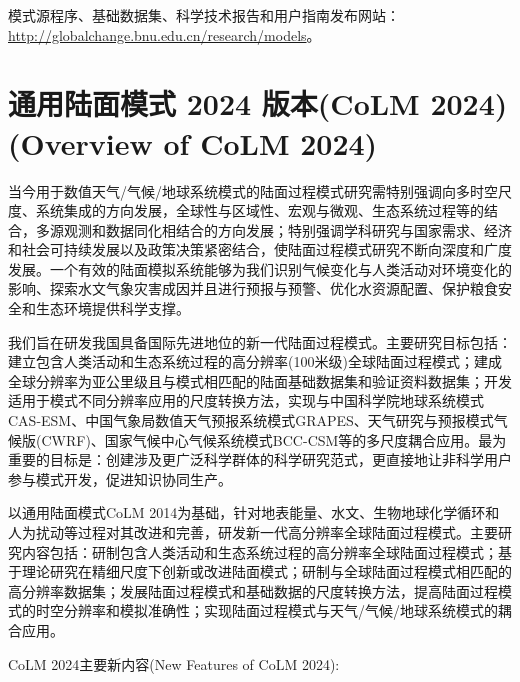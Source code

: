 模式源程序、基础数据集、科学技术报告和用户指南发布网站： \url{http://globalchange.bnu.edu.cn/research/models}。


\section[通用陆面模式 2024 版本(CoLM 2024)]{通用陆面模式 2024 版本(CoLM 2024) (Overview of CoLM 2024)}
当今用于数值天气/气候/地球系统模式的陆面过程模式研究需特别强调向多时空尺度、系统集成的方向发展，全球性与区域性、宏观与微观、生态系统过程等的结合，多源观测和数据同化相结合的方向发展；特别强调学科研究与国家需求、经济和社会可持续发展以及政策决策紧密结合，使陆面过程模式研究不断向深度和广度发展。一个有效的陆面模拟系统能够为我们识别气候变化与人类活动对环境变化的影响、探索水文气象灾害成因并且进行预报与预警、优化水资源配置、保护粮食安全和生态环境提供科学支撑。

我们旨在研发我国具备国际先进地位的新一代陆面过程模式。主要研究目标包括：建立包含人类活动和生态系统过程的高分辨率(100米级)全球陆面过程模式；建成全球分辨率为亚公里级且与模式相匹配的陆面基础数据集和验证资料数据集；开发适用于模式不同分辨率应用的尺度转换方法，实现与中国科学院地球系统模式CAS-ESM、中国气象局数值天气预报系统模式GRAPES、天气研究与预报模式气候版(CWRF)、国家气候中心气候系统模式BCC-CSM等的多尺度耦合应用。最为重要的目标是：创建涉及更广泛科学群体的科学研究范式，更直接地让非科学用户参与模式开发，促进知识协同生产。

以通用陆面模式CoLM 2014为基础，针对地表能量、水文、生物地球化学循环和人为扰动等过程对其改进和完善，研发新一代高分辨率全球陆面过程模式。主要研究内容包括：研制包含人类活动和生态系统过程的高分辨率全球陆面过程模式；基于理论研究在精细尺度下创新或改进陆面模式；研制与全球陆面过程模式相匹配的高分辨率数据集；发展陆面过程模式和基础数据的尺度转换方法，提高陆面过程模式的时空分辨率和模拟准确性；实现陆面过程模式与天气/气候/地球系统模式的耦合应用。

CoLM 2024主要新内容(New Features of CoLM 2024):

